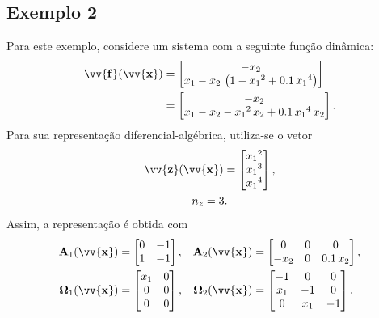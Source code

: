 \documentclass{ppgeesa}
\newcommand*{\Round}[1]{\left(#1\right)}
\newcommand*{\Prod}{\,}
\newcommand*{\Bold}[1]{\boldsymbol{\mathbf{#1}}}
\newcommand*{\Matr}[1]{\Bold{#1}}
\newcommand*{\Vect}[1]{\vv{\Bold{#1}}}
\begin{document}
\subsection{Exemplo 2}
Para este exemplo, considere um sistema com a seguinte função dinâmica:
\begin{equation}
  \begin{aligned}
    \Vect{f}(\Vect{x})
    &= \begin{bmatrix}
      -x_2
      \\
      x_1 -x_2 \Prod \Round{1 -{x_1}^2 + \num{0.1} \Prod {x_1}^4}
    \end{bmatrix}
    \\
    &= \begin{bmatrix}
      -x_2
      \\
      x_1 -x_2 -{x_1}^2 \Prod x_2 + \num{0.1} \Prod {x_1}^4 \Prod x_2
    \end{bmatrix}
    .
  \end{aligned}
\end{equation}
Para sua representação diferencial-algébrica, utiliza-se o vetor
\begin{gather}
  \Vect{z}(\Vect{x}) = \begin{bmatrix} {x_1}^2 \\ {x_1}^3 \\ {x_1}^4 \end{bmatrix}
  ,
  \\
  n_z = 3
  .
\end{gather}
Assim, a representação é obtida com
\begin{align}
  \Matr{A}_1(\Vect{x})
  &= \begin{bmatrix}
    0 & -1 \\
    1 & -1 \\
  \end{bmatrix}
  ,&
  \Matr{A}_2(\Vect{x})
  &= \begin{bmatrix}
    0    & 0 & 0                   \\
    -x_2 & 0 & \num{0.1} \Prod x_2 \\
  \end{bmatrix}
  ,
  \\
  \Matr{\Omega}_1(\Vect{x})
  &= \begin{bmatrix}
    x_1 & 0 \\
    0   & 0 \\
    0   & 0 \\
  \end{bmatrix}
  ,&
  \Matr{\Omega}_2(\Vect{x})
  &= \begin{bmatrix}
    -1  & 0   & 0  \\
    x_1 & -1  & 0  \\
    0   & x_1 & -1 \\
  \end{bmatrix}
  .
\end{align}
\end{document}

